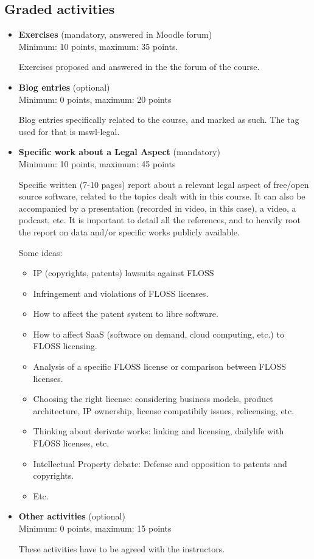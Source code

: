 \documentclass[a4paper]{article}
\begin{document}
\subsection{Graded activities}

\begin{itemize}
\item \textbf{Exercises} (mandatory, answered in Moodle forum) \\
  Minimum: 10 points, maximum: 35 points.

  Exercises proposed and answered in the the forum of the course.

\item \textbf{Blog entries} (optional) \\
  Minimum: 0 points, maximum: 20 points

  Blog entries specifically related to the course, and marked as such. The tag used for that is mswl-legal.

\item \textbf{Specific work about a Legal Aspect} (mandatory) \\
  Minimum: 10 points, maximum: 45 points

  Specific written (7-10 pages) report about a relevant legal aspect of free/open source software, related to the topics dealt with in this course. It can also be accompanied by a presentation (recorded in video, in this case), a video, a podcast, etc. It is important to detail all the references, and to heavily root the report on data and/or specific works publicly available.

\medskip

Some ideas:

\begin{itemize}
\item IP (copyrights, patents) lawsuits against FLOSS
\item Infringement and violations of FLOSS licenses.
\item How to affect the patent system to libre software.
\item How to affect SaaS (software on demand, cloud computing, etc.) to FLOSS licensing.
\item Analysis of a specific FLOSS license or comparison between FLOSS licenses.
\item Choosing the right license: considering business models, product architecture,  IP ownership, license compatibily issues, relicensing, etc.
\item Thinking about derivate works: linking and licensing, dailylife with FLOSS licenses, etc.
\item Intellectual Property debate: Defense and opposition to pat­ents and copyrights. 
\item Etc.

\end{itemize}



\item \textbf{Other activities} (optional) \\
  Minimum: 0 points, maximum: 15 points

  These activities have to be agreed with the instructors.
\end{itemize}
\end{document}
